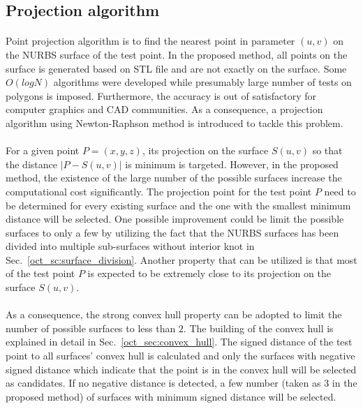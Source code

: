 \subsection{Projection algorithm}
\paragraph{}
Point projection algorithm is to find the nearest point in parameter $(u, v)$ on the NURBS surface of the test point.
In the proposed method, all points on the surface is generated based on STL file and are not exactly on the surface.
Some $O(logN)$ algorithms were developed \cite{Edelsbrunner:1985:CED:4007.4011, Chin1983OptimalAF} while presumably large number of tests on polygons is imposed.
Furthermore, the accuracy is out of satisfactory for computer graphics and CAD communities.
As a consequence, a projection algorithm \cite{MA200379} using Newton-Raphson method is introduced to tackle this problem.

\paragraph{}
For a given point $P=(x,y,z)$, its projection on the surface $S(u, v)$ so that the distance $|P-S(u,v)|$ is minimum is targeted.
However, in the proposed method, the existence of the large number of the possible surfaces increase the computational cost significantly.
The projection point for the test point $P$ need to be determined for every existing surface and the one with the smallest minimum distance will be selected.
One possible improvement could be limit the possible surfaces to only a few by utilizing the fact that the NURBS surfaces has been divided into multiple sub-surfaces without interior knot in Sec.~\ref{oct_sc:surface_division}.
Another property that can be utilized is that most of the test point $P$ is expected to be extremely close to its projection on the surface $S(u,v)$.

\paragraph{}
As a consequence, the strong convex hull property can be adopted to limit the number of possible surfaces to less than $2$.
The building of the convex hull is explained in detail in Sec.~\ref{oct_sec:convex_hull}.
The signed distance of the test point to all surfaces' convex hull is calculated and only the surfaces with negative signed distance which indicate that the point is in the convex hull will be selected as candidates.
If no negative distance is detected, a few number (taken as $3$ in the proposed method) of surfaces with minimum signed distance will be selected.

